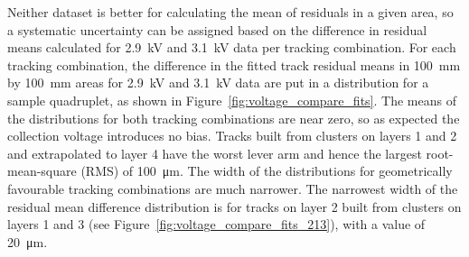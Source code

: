 Neither dataset is better for calculating the mean of residuals in a given area, so a systematic uncertainty can be assigned based on the difference in residual means calculated for \SI{2.9}{kV} and \SI{3.1}{kV} data per tracking combination. For each tracking combination, the difference in the fitted track residual means in \SI{100}{mm} by \SI{100}{mm} areas for \SI{2.9}{kV} and \SI{3.1}{kV} data are put in a distribution for a sample quadruplet, as shown in Figure~\ref{fig:voltage_compare_fits}. The means of the distributions for both tracking combinations are near zero, so as expected the collection voltage introduces no bias. Tracks built from clusters on layers 1 and 2 and extrapolated to layer 4 have the worst lever arm and hence the largest root-mean-square (RMS) of \SI{100}{\micro\meter}. The width of the distributions for geometrically favourable tracking combinations are much narrower. The narrowest width of the residual mean difference distribution is for tracks on layer 2 built from clusters on layers 1 and 3 (see Figure~\ref{fig:voltage_compare_fits_213}), with a value of \SI{20}{\micro\meter}.

